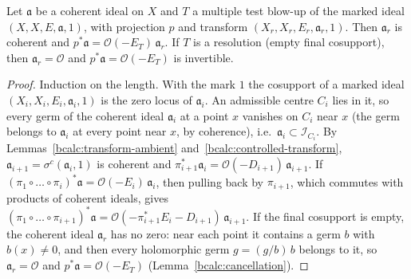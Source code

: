 \begin{proposition}
\label{bcalc:principalization}
\mixedleanok
Let \(\mathfrak a\) be a coherent ideal on \(X\) and \(T\) a multiple test blow-up of the marked ideal \((X,X,E,\mathfrak a,1)\), with
projection \(p\) and transform \((X_r,X_r,E_r,\mathfrak a_r,1)\). Then \(\mathfrak a_r\) is coherent and
\(p^*\mathfrak a=\mathcal O(-E_T)\,\mathfrak a_r\). If \(T\) is a resolution (empty final cosupport), then \(\mathfrak a_r=\mathcal O\)
and \(p^*\mathfrak a=\mathcal O(-E_T)\) is invertible.
\end{proposition}
\begin{proof}
\mixedleanok
Induction on the length. With the mark \(1\) the cosupport of a marked ideal \((X_i,X_i,E_i,\mathfrak a_i,1)\) is the zero locus of
\(\mathfrak a_i\). An admissible centre \(C_i\) lies in it, so every germ of the coherent ideal \(\mathfrak a_i\) at a point \(x\)
vanishes on \(C_i\) near \(x\) (the germ belongs to \(\mathfrak a_i\) at every point near \(x\), by coherence), i.e.\
\(\mathfrak a_i\subset\mathcal I_{C_i}\). By Lemmas~\ref{bcalc:transform-ambient} and~\ref{bcalc:controlled-transform},
\(\mathfrak a_{i+1}=\sigma^{c}(\mathfrak a_i,1)\) is coherent and \(\pi_{i+1}^*\mathfrak a_i=\mathcal O(-D_{i+1})\,\mathfrak a_{i+1}\).
If \((\pi_1\circ\dots\circ\pi_i)^*\mathfrak a=\mathcal O(-E_i)\,\mathfrak a_i\), then pulling back by \(\pi_{i+1}\), which commutes with
products of coherent ideals, gives \((\pi_1\circ\dots\circ\pi_{i+1})^*\mathfrak a=\mathcal O(-\pi_{i+1}^*E_i-D_{i+1})\,\mathfrak a_{i+1}\).
If the final cosupport is empty, the coherent ideal \(\mathfrak a_r\) has no zero: near each point it contains a germ \(b\) with
\(b(x)\ne0\), and then every holomorphic germ \(g=(g/b)\,b\) belongs to it, so \(\mathfrak a_r=\mathcal O\) and
\(p^*\mathfrak a=\mathcal O(-E_T)\) (Lemma~\ref{bcalc:cancellation}).
\end{proof}

